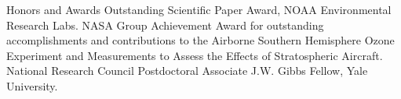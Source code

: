 %
%
\begin{rubric}{Honors and Awards}
\entry*[1998]Outstanding Scientific Paper Award, NOAA Environmental Research Labs.
\entry*[1995]NASA Group Achievement Award for outstanding accomplishments and contributions to the 
Airborne Southern Hemisphere Ozone Experiment and Measurements to Assess the Effects of Stratospheric Aircraft.
\entry*[1991--1993]National Research Council Postdoctoral Associate
\entry*[1985--1986]J.W. Gibbs Fellow, Yale University.
\end{rubric}
